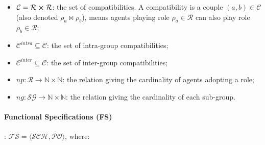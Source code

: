 \documentclass[pdflatex,sn-mathphys-num]{sn-jnl}%
\theoremstyle{thmstyleone}%
\theoremstyle{thmstyletwo}%
\theoremstyle{thmstylethree}%
\begin{document}
\begin{itemize}
\begin{itemize}
              \item $\mathcal{C} = \mathcal{R} \cross \mathcal{R}$: the set of compatibilities. A compatibility is a couple $(a,b) \in \mathcal{C}$ (also denoted $\rho_a \bowtie \rho_b$), means agents playing role $\rho_a \in \mathcal{R}$ can also play role $\rho_b \in \mathcal{R}$;
              \item $\mathcal{C}^{intra} \subseteq \mathcal{C}$: the set of intra-group compatibilities;
              \item $\mathcal{C}^{inter} \subseteq \mathcal{C}$: the set of inter-group compatibilities;

              \item $np: \mathcal{R} \rightarrow \mathbb{N} \times \mathbb{N}$: the relation giving the cardinality of agents adopting a role;
              \item $ng: \mathcal{SG} \rightarrow \mathbb{N} \times \mathbb{N}$: the relation giving the cardinality of each sub-group.

          \end{itemize}

\end{itemize}

\paragraph{\textbf{Functional Specifications (FS)}}: $\mathcal{FS} = \langle \mathcal{SCH}, \mathcal{PO} \rangle$, where:
\end{document}

